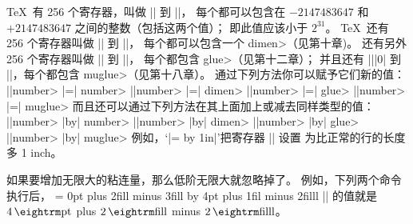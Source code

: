 \danger \1\TeX\ 有 256 个寄存器，叫做 || 到 ||，
每个都可以包含在 $-2147483647$ 和 $+2147483647$ 之间的整数（包括这两个值）；
即此值应该小于 $2^{31}$。
\TeX\ 还有 256 个寄存器叫做 || 到 ||，
每个都可以包含一个 \<dimen>（见第十章)。
还有另外 256 个寄存器叫做 || 到 ||，
每个都包含 \<glue>（见第十二章）；
并且还有 |\muskip||0| 到 ||，每个都包含 \<muglue>（见第十八章）。
通过下列方法你可以赋予它们新的值：
\begindisplay
|\count|\<number> |=| \<number>\cr
|\dimen|\<number> |=| \<dimen>\cr
|\skip|\<number> |=| \<glue>\cr
|\muskip|\<number> |=| \<muglue>\cr
\enddisplay
而且还可以通过下列方法在其上面加上或减去同样类型的值：
\begindisplay
|\advance\count|\<number> |by| \<number>\cr
|\advance\dimen|\<number> |by| \<dimen>\cr
|\advance\skip|\<number> |by| \<glue>\cr
|\advance\muskip|\<number> |by| \<muglue>\cr
\enddisplay
例如，`|=\hsize \advance{} by 1in|'把寄存器 || 设置%
为比正常的行的长度多 1 inch。

\danger 如果要增加无限大的粘连量，那么低阶无限大就忽略掉了。%
例如，下列两个命令执行后，
\begintt
{} = 0pt plus 2fill minus 3fill
\advance{} by 4pt plus 1fil minus 2filll
\endtt
|| 的值就是 $4\pt$ plus $2\,{\rm fill}$ minus
$2\,{\rm filll}$。

